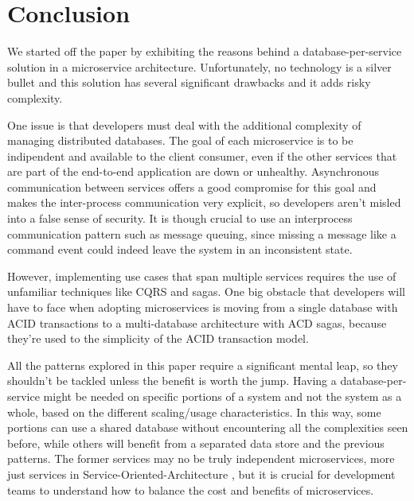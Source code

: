 \documentclass[conference]{IEEEtran}
\begin{document}
\section{Conclusion}

We started off the paper by exhibiting the reasons behind a database-per-service solution in a microservice architecture. Unfortunately, no technology is a silver bullet and this solution has several significant drawbacks and it adds risky complexity.

One issue is that developers must deal with the additional complexity of managing distributed databases. The goal of each microservice is to be indipendent and available to the client consumer, even if the other services that are part of the end-to-end application are down or unhealthy. Asynchronous communication between services offers a good compromise for this goal and makes the inter-process communication very explicit, so developers aren't misled into a false sense of security. It is though crucial to use an interprocess communication pattern such as message queuing, since missing a message like a command event could indeed leave the system in an inconsistent state. 

However, implementing use cases that span multiple services requires the use of unfamiliar techniques like CQRS and sagas. One big obstacle that developers will have to face when adopting microservices is moving from a single database with ACID transactions to a multi-database architecture with ACD sagas, because they're used to the simplicity of the ACID transaction model.

All the patterns explored in this paper require a significant mental leap, so they shouldn't be tackled unless the benefit is worth the jump. Having a database-per-service might be needed on specific portions of a system and not the system as a whole, based on the different scaling/usage characteristics. In this way, some portions can use a shared database without encountering all the complexities seen before, while others will benefit  from a separated data store and the previous patterns. The former services may no be truly independent microservices, more just services in Service-Oriented-Architecture \cite{soa}, but it is crucial for development teams to understand how to balance the cost and benefits of microservices. 

\end{document}
